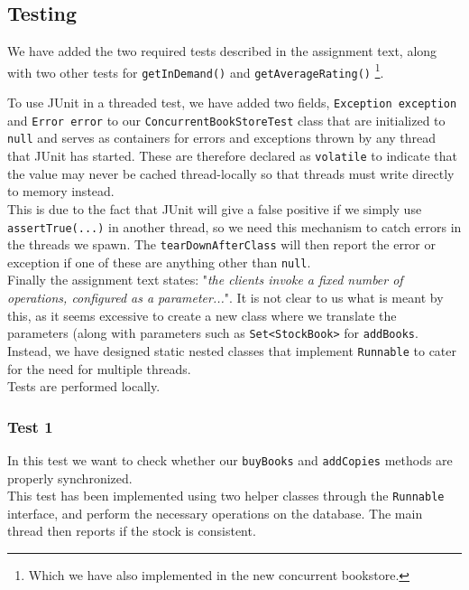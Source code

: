 \documentclass[11pt]{article}
\begin{document}
\subsection*{Testing}

We have added the two required tests described in the assignment text, along
with two other tests for \texttt{getInDemand()} and \texttt{getAverageRating()}
\footnote{Which we have also implemented in the new concurrent bookstore.}.

To use JUnit in a threaded test, we have added two fields,
\texttt{Exception exception} and \texttt{Error error} to our
\texttt{ConcurrentBookStoreTest} class that are initialized
to {\tt null} and serves as containers for errors and exceptions thrown by any thread that
JUnit has started. These are therefore declared as \texttt{volatile} to indicate that the 
value may never be cached thread-locally so that threads must write directly to
memory instead.\\
This is due to the fact that JUnit will give a false positive if we simply
use \texttt{assertTrue(...)} in another thread, so we need this mechanism to
catch errors in the threads we spawn.
The \texttt{tearDownAfterClass} will then report the error or exception if one
of these are anything other than \texttt{null}.\\

Finally the assignment text states: "\emph{the clients invoke a fixed number of operations,
configured as a parameter...}". It is not clear to us what is meant by this, as
it seems excessive to create a new class where we translate the parameters (along with
parameters such as \texttt{Set<StockBook>} for \texttt{addBooks}. Instead, we have
designed static nested classes that implement \texttt{Runnable} to cater for the
need for multiple threads.\\

Tests are performed locally.

\subsubsection*{Test 1}

In this test we want to check whether our \texttt{buyBooks} and \texttt{addCopies}
methods are properly synchronized.\\
This test has been implemented using two helper classes through the \texttt{Runnable}
interface, and perform the necessary operations on the database. The main thread
then reports if the stock is consistent.
\end{document}
